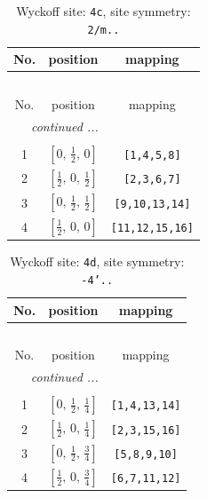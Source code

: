 \documentclass[fleqn,8pt]{jsarticle}
\begin{document}
\renewcommand{\arraystretch}{1.2}
\begin{longtable}{ccc}
\caption{Wyckoff site: {\tt 4c}, site symmetry: {\tt 2/m..}}
 \\
 \hline \hline
No. & position & mapping \\ \hline \endfirsthead

\multicolumn{2}{l}{\tablename\ \thetable{}} \\
 \hline \hline
No. & position & mapping \\ \hline \endhead

 \hline \hline
\multicolumn{2}{r}{\footnotesize\it continued ...} \\ \endfoot

 \hline \hline
\multicolumn{2}{r}{} \\ \endlastfoot

1 & $\left[ 0,\, \frac{1}{2},\, 0 \right]$ & {\tt [1,4,5,8]} \\ \hline
2 & $\left[ \frac{1}{2},\, 0,\, \frac{1}{2} \right]$ & {\tt [2,3,6,7]} \\ \hline
3 & $\left[ 0,\, \frac{1}{2},\, \frac{1}{2} \right]$ & {\tt [9,10,13,14]} \\ \hline
4 & $\left[ \frac{1}{2},\, 0,\, 0 \right]$ & {\tt [11,12,15,16]} \\
\end{longtable}
\renewcommand{\arraystretch}{1.2}
\begin{longtable}{ccc}
\caption{Wyckoff site: {\tt 4d}, site symmetry: {\tt -4'..}}
 \\
 \hline \hline
No. & position & mapping \\ \hline \endfirsthead

\multicolumn{2}{l}{\tablename\ \thetable{}} \\
 \hline \hline
No. & position & mapping \\ \hline \endhead

 \hline \hline
\multicolumn{2}{r}{\footnotesize\it continued ...} \\ \endfoot

 \hline \hline
\multicolumn{2}{r}{} \\ \endlastfoot

1 & $\left[ 0,\, \frac{1}{2},\, \frac{1}{4} \right]$ & {\tt [1,4,13,14]} \\ \hline
2 & $\left[ \frac{1}{2},\, 0,\, \frac{1}{4} \right]$ & {\tt [2,3,15,16]} \\ \hline
3 & $\left[ 0,\, \frac{1}{2},\, \frac{3}{4} \right]$ & {\tt [5,8,9,10]} \\ \hline
4 & $\left[ \frac{1}{2},\, 0,\, \frac{3}{4} \right]$ & {\tt [6,7,11,12]} \\
\end{longtable}
\end{document}

